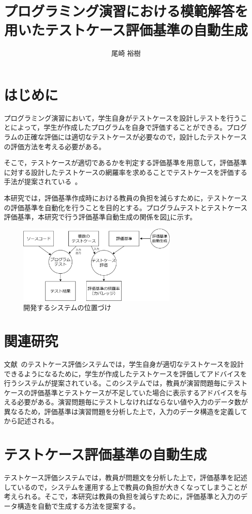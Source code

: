 \documentclass[10pt]{tpu-abst}
\author{尾崎 裕樹}
\title{プログラミング演習における模範解答を\\用いたテストケース評価基準の自動生成}
\begin{document}
%
\maketitle
%
%

\section{ はじめに}
%
プログラミング演習において，学生自身がテストケースを設計しテストを行うことによって，学生が作成したプログラムを自身で評価することができる。プログラムの正確な評価には適切なテストケースが必要なので，設計したテストケースの評価方法を考える必要がある。

そこで，テストケースが適切であるかを判定する評価基準を用意して，評価基準に対する設計したテストケースの網羅率を求めることでテストケースを評価する手法が提案されている~\cite{a1}。

本研究では，評価基準作成時における教員の負担を減らすために，テストケースの評価基準を自動化を行うことを目的とする。プログラムテストとテストケース評価基準，本研究で行う評価基準自動生成の関係を図\ref{cap1}に示す。
\begin{figure}[h]
  \centering
  \includegraphics[width=80mm]{開発するシステムの位置づけmini3.png}
  \caption{開発するシステムの位置づけ}
  \label{cap1}
\end{figure}
%
\section{関連研究}
%
文献~\cite{a1}のテストケース評価システムでは，学生自身が適切なテストケースを設計できるようになるために，学生が作成したテストケースを評価してアドバイスを行うシステムが提案されている。このシステムでは，教員が演習問題毎にテストケースの評価基準とテストケースが不足していた場合に表示するアドバイスを与える必要がある。演習問題毎にテストしなければならない値や入力のデータ数が異なるため，評価基準は演習問題を分析した上で，入力のデータ構造を定義してから記述される。
%
\section{テストケース評価基準の自動生成}
テストケース評価システムでは，教員が問題文を分析した上で，評価基準を記述しているので，システムを運用する上で教員の負担が大きくなってしまうことが考えられる。そこで，本研究は教員の負担を減らすために，評価基準と入力のデータ構造を自動で生成する方法を提案する。
\end{document}
